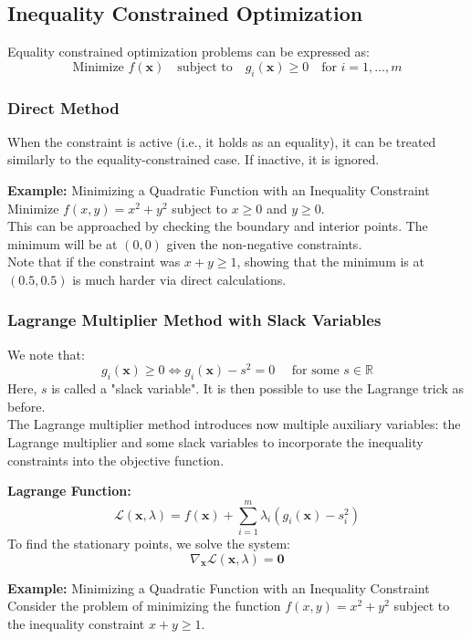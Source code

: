 \documentclass[]{article}
\newcommand{\R}{\mathbb{R}}
\begin{document}
	\subsection{Inequality Constrained Optimization}
	Equality constrained optimization problems can be expressed as:
	$$
	\text{Minimize } f(\mathbf{x})
	\quad
	\text{subject to}
	\quad
	g_i(\mathbf{x}) \geq 0
	\quad
	\text{for } i = 1, \dots, m
	$$
	
	\subsubsection{Direct Method}
	When the constraint is active (i.e., it holds as an equality), it can be treated similarly to the equality-constrained case.
	If inactive, it is ignored.
	
	\textbf{Example:}
	Minimizing a Quadratic Function with an Inequality Constraint
	\\
	Minimize $f(x, y) = x^2 + y^2$ subject to $x \geq 0$ and $y \geq 0$.
	\\
	This can be approached by checking the boundary and interior points.
	The minimum will be at $(0,0)$ given the non-negative constraints.
	\\
	Note that if the constraint was $x+y \geq 1$, showing that the minimum is at $(0.5, 0.5)$ is much harder via direct calculations.
	
	\subsubsection{Lagrange Multiplier Method with Slack Variables}
	We note that:
	$$
	g_i(\mathbf{x}) \geq 0
	\iff
	g_i(\mathbf{x}) -s^2 = 0
	\quad
	\text{ for some } s \in \R
	$$
	Here, $s$ is called a "slack variable".
	It is then possible to use the Lagrange trick as before.
	\\
	The Lagrange multiplier method introduces now multiple auxiliary variables: the Lagrange multiplier and some slack variables to incorporate the inequality constraints into the objective function.
	
	\textbf{Lagrange Function:}
	$$
	\mathcal{L}(\mathbf{x}, \lambda)
	= f(\mathbf{x}) + \sum_{i=1}^m \lambda_i \left( g_i(\mathbf{x}) - s_i^2 \right)
	$$
	To find the stationary points, we solve the system:
	$$
	\nabla_\mathbf{x} \mathcal{L}(\mathbf{x}, \lambda) = \mathbf{0}
	$$
	
	\textbf{Example:}
	Minimizing a Quadratic Function with an Inequality Constraint\\
	Consider the problem of minimizing the function $f(x, y) = x^2 + y^2$ subject to the inequality constraint $x + y \geq 1$.
	
\end{document}
